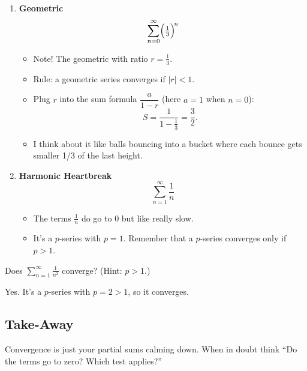 \documentclass{article}
\begin{document}
\begin{enumerate}[label=\textbf{\arabic*.},topsep=4pt,itemsep=10pt]

  \item \textbf{Geometric}  
        \[
        \sum_{n=0}^{\infty}\Bigl(\tfrac13\Bigr)^{\!n}
        \]
        \begin{itemize}[itemsep=2pt]
          \item Note! The geometric with ratio \(r=\tfrac13\).
          \item Rule: a geometric series converges if \(|r|<1\).
          \item Plug \(r\) into the sum formula \(\dfrac{a}{1-r}\)  
                (here \(a=1\) when \(n=0\)):
                \[
                  S = \frac{1}{1-\tfrac13} = \frac32.
                \]
          \item I think about it like balls bouncing into a bucket where each bounce gets smaller 1/3 of the last height. 
        \end{itemize}

  \item \textbf{Harmonic Heartbreak}  
        \[
        \sum_{n=1}^{\infty}\frac1n
        \]
        \begin{itemize}[itemsep=2pt]
          \item The terms \(\tfrac1n\) do go to \(0\) but like really slow.  
          \item It’s a \(p\)-series with \(p=1\). Remember that a \(p\)-series converges only if \(p>1\).  
        \end{itemize}

\end{enumerate}

\begin{tcolorbox}[colback=green!5!white,colframe=green!50!black,title=Quick-Check]
Does \( \displaystyle\sum_{n=1}^{\infty}\frac{1}{n^{2}} \) converge? (Hint: \(p>1\).)

\begin{tcolorbox}[colback=white, sharp corners, boxrule=0pt, title=Spoiler – click to reveal, breakable]
Yes. It’s a \(p\)-series with \(p=2>1\), so it converges.  
\end{tcolorbox}
\end{tcolorbox}

\subsection*{Take-Away}
Convergence is just your partial sums calming down.  
When in doubt think “Do the terms go to zero? Which test applies?”  
\end{document}

